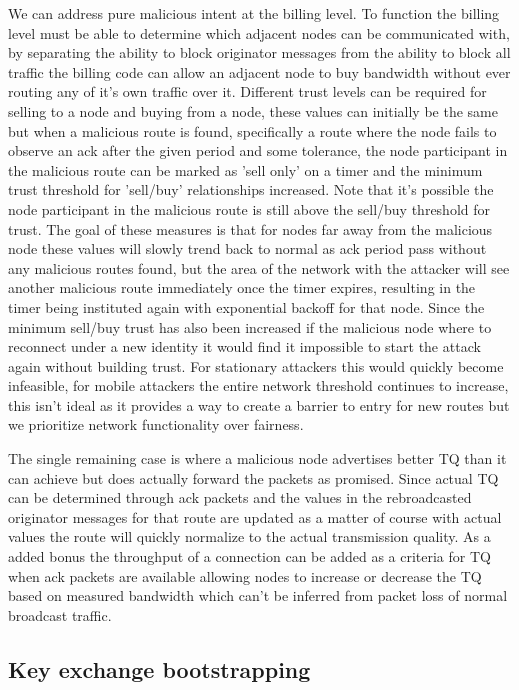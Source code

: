 \documentclass[11pt]{article}
\begin{document}
               We can address pure malicious intent at the billing level. To function the billing level must be able to determine which adjacent nodes can be communicated with, by separating the ability to block originator messages from the ability to block all traffic the billing code can allow an adjacent node to buy bandwidth without ever routing any of it's own traffic over it. Different trust levels can be required for selling to a node and buying from a node, these values can initially be the same but when a malicious route is found, specifically a route where the node fails to observe an ack after the given period and some tolerance, the node participant in the malicious route can be marked as 'sell only' on a timer and the minimum trust threshold for 'sell/buy' relationships increased. Note that it's possible the node participant in the malicious route is still above the sell/buy threshold for trust. The goal of these measures is that for nodes far away from the malicious node these values will slowly trend back to normal as ack period pass without any malicious routes found, but the area of the network with the attacker will see another malicious route immediately once the timer expires, resulting in the timer being instituted again with exponential backoff for that node. Since the minimum sell/buy trust has also been increased if the malicious node where to reconnect under a new identity it would find it impossible to start the attack again without building trust. For stationary attackers this would quickly become infeasible, for mobile attackers the entire network threshold continues to increase, this isn't ideal as it provides a way to create a barrier to entry for new routes but we prioritize network functionality over fairness.
               
               The single remaining case is where a malicious node advertises better TQ than it can achieve but does actually forward the packets as promised. Since actual TQ can be determined through ack packets and the values in the rebroadcasted originator messages for that route are updated as a matter of course with actual values the route will quickly normalize to the actual transmission quality. As a added bonus the throughput of a connection can be added as a criteria for TQ when ack packets are available allowing nodes to increase or decrease the TQ based on measured bandwidth which can't be inferred from packet loss of normal broadcast traffic. 
               
    \subsection{Key exchange bootstrapping}
    
\end{document}
